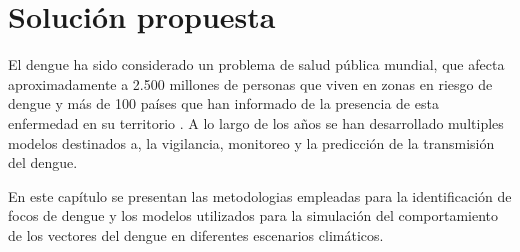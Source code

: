 \chapter{Solución propuesta}

El dengue ha sido considerado un problema de salud pública mundial, que afecta aproximadamente a
2.500 millones de personas que viven en zonas en riesgo de dengue y más de 100 países que han
informado de la presencia de esta enfermedad en su territorio \citet{gustavo2006dengue}. A lo
largo de los años se han desarrollado multiples modelos destinados a, la vigilancia, monitoreo y
la predicción de la transmisión del dengue.

En este capítulo se presentan las metodologias empleadas para la identificación de focos de dengue
y los modelos utilizados para la simulación del comportamiento de los vectores del dengue en
diferentes escenarios climáticos.





%
%
%
